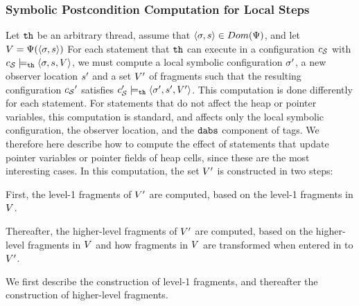 \subsubsection{Symbolic Postcondition Computation for Local Steps}
Let ${\tt th}$ be an arbitrary thread, assume
that $\left\langle\sigma,s\right\rangle \in Dom(\Psi)$,
and let $V = \Psi(\left\langle\sigma,s\right\rangle)$
For each statement that ${\tt th}$ can execute in a configuration $c_{\mathcal S}$
with $c_{\mathcal S} \models_{{\tt th}} \left\langle\sigma,s,V\right\rangle$,
we must compute a local symbolic configuration $\sigma'$, a new
observer location $s'$ and a set  $V'$ of fragments
such that the resulting configuration ${c_{\mathcal S}}'$ satisfies
$c_{\mathcal S}' \models_{{\tt th}} \left\langle\sigma',s',V'\right\rangle$.
This computation is done differently for
each statement. For statements that do not affect the heap or pointer variables,
this computation is standard, and affects only the local symbolic
configuration, the observer location, and the $\mathtt{dabs}$ component of
tags.
We therefore here describe how to compute the effect of statements that update
pointer variables or pointer fields of heap cells,
since these are the most interesting cases.
In this computation, the set $V'$ is constructed in two steps:
\begin{inparaenum}[(1)]
\item First, the level-1 fragments of $V'$ are computed, based on
  the level-1 fragments in $V$.
\item
  Thereafter, the higher-level fragments of $V'$ are computed, based
  on the higher-level fragments in $V$ and
  how fragments in $V$ are transformed
  when entered in to $V'$.
\end{inparaenum}
We first describe the construction of level-1 fragments, and thereafter the
construction of higher-level fragments.

